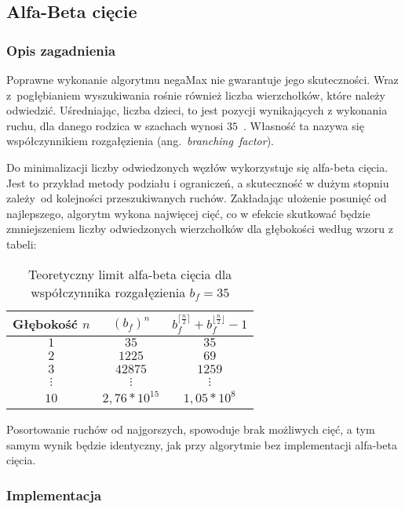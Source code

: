 \subsection{Alfa-Beta cięcie}
\label{subsec:alfa-beta-ciecie}
\subsubsection{Opis zagadnienia}
Poprawne wykonanie algorytmu negaMax nie gwarantuje jego skuteczności.
Wraz z~pogłębianiem wyszukiwania rośnie również liczba wierzchołków, które należy odwiedzić.
Uśredniając, liczba dzieci, to jest pozycji wynikających z wykonania ruchu, dla danego rodzica w szachach wynosi $35$~\cite*{branching-factor}.
Własność ta nazywa się współczynnikiem rozgałęzienia (ang.~\textit{branching~factor}).

Do minimalizacji liczby odwiedzonych węzłów wykorzystuje się alfa-beta cięcia.
Jest to przykład metody podziału i ograniczeń, a skuteczność w dużym stopniu zależy~od kolejności przeszukiwanych ruchów.
Zakładając ułożenie posunięć od najlepszego, algorytm wykona najwięcej cięć, co w efekcie skutkować będzie zmniejszeniem liczby odwiedzonych wierzchołków dla głębokości według wzoru z tabeli:

\begin{table}[htb] \small
\centering
\caption{Teoretyczny limit alfa-beta cięcia dla współczynnika rozgałęzienia $b_f = 35$}
\label{tab:alfa-beat-limit}
\renewcommand{\arraystretch}{1.5}
\begin{tabular}{|c|c|c|}\hline
Głębokość $n$ & $({b_{f}})^{n}$ & $b_{f}^{\lceil \frac{n}{2} \rceil} + b_{f}^{\lfloor \frac{n}{2} \rfloor} - 1$\\ \hline\hline

$1$ & $35$ & $35$\\ \hline
$2$ & $1225$ & $69$\\ \hline
$3$ & $42 875$ & $1259$\\ \hline
$\vdots$ & $\vdots$ & $\vdots$\\ \hline
$10$ & $2,76 * 10^{15}$ & $1,05 * 10^{8}$\\ \hline

\end{tabular}
\end{table}

Posortowanie ruchów od najgorszych, spowoduje brak możliwych cięć, a tym samym wynik będzie identyczny, jak przy algorytmie bez implementacji alfa-beta cięcia.


\subsubsection{Implementacja}

